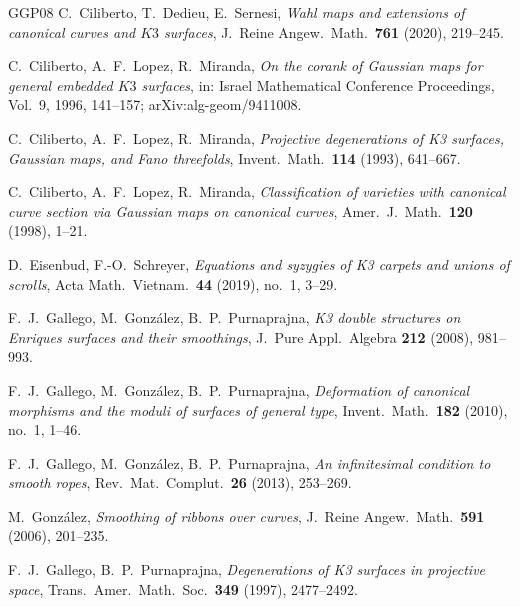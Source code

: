 \documentclass[11pt,twoside]{amsart}
\theoremstyle{plain}
\theoremstyle{definition}
\begin{document}
\begin{thebibliography}{GGP08}
 C.~Ciliberto, T.~Dedieu, E.~Sernesi, \emph{Wahl maps and extensions of canonical curves and $K3$ surfaces}, J.\ Reine Angew.\ Math.\ \textbf{761} (2020), 219--245.

 C.~Ciliberto, A.~F.~Lopez, R.~Miranda, \emph{On the corank of Gaussian maps for general embedded $K3$ surfaces}, in: Israel Mathematical Conference Proceedings, Vol.~9, 1996, 141--157; arXiv:alg-geom/9411008.

 C.~Ciliberto, A.~F.~Lopez, R.~Miranda, \emph{Projective degenerations of K3 surfaces, Gaussian maps, and Fano threefolds}, Invent.\ Math.\ \textbf{114} (1993), 641--667.

 C.~Ciliberto, A.~F.~Lopez, R.~Miranda, \emph{Classification of varieties with canonical curve section via Gaussian maps on canonical curves}, Amer.\ J.\ Math.\ \textbf{120} (1998), 1--21.



 D.~Eisenbud, F.-O.~Schreyer, \emph{Equations and syzygies of K3 carpets and unions of scrolls}, Acta Math.\ Vietnam.\ \textbf{44} (2019), no.~1, 3--29.

 F.~J.~Gallego, M.~Gonz\'alez, B.~P.~Purnaprajna, \emph{K3 double structures on Enriques surfaces and their smoothings}, J.\ Pure Appl.\ Algebra \textbf{212} (2008), 981--993.

 F.~J.~Gallego, M.~Gonz\'alez, B.~P.~Purnaprajna, \emph{Deformation of canonical morphisms and the moduli of surfaces of general type}, Invent.\ Math.\ \textbf{182} (2010), no.~1, 1--46.

 F.~J.~Gallego, M.~Gonz\'alez, B.~P.~Purnaprajna, \emph{An infinitesimal condition to smooth ropes}, Rev.\ Mat.\ Complut.\ \textbf{26} (2013), 253--269.

 M.~Gonz\'alez, \emph{Smoothing of ribbons over curves}, J.\ Reine Angew.\ Math.\ \textbf{591} (2006), 201--235.

 F.~J.~Gallego, B.~P.~Purnaprajna, \emph{Degenerations of K3 surfaces in projective space}, Trans.\ Amer.\ Math.\ Soc.\ \textbf{349} (1997), 2477--2492.


\end{thebibliography}
\end{document}

